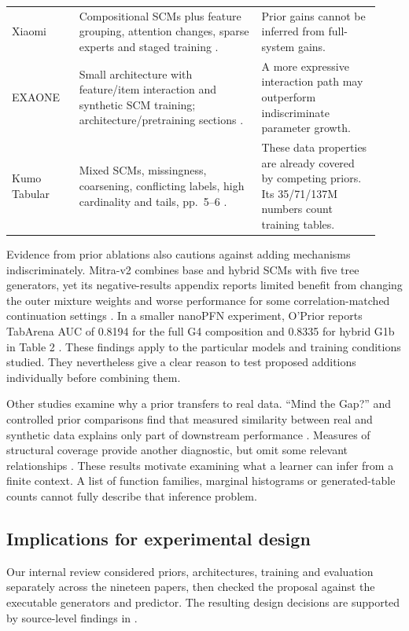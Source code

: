 \documentclass[11pt]{article}
\begin{document}
\begin{longtable}{@{}p{0.17\linewidth}p{0.46\linewidth}p{0.30\linewidth}@{}}
Xiaomi & Compositional SCMs plus feature grouping, attention changes, sparse experts and staged training \cite{xiaomi}. & Prior gains cannot be inferred from full-system gains.\\
EXAONE & Small architecture with feature/item interaction and synthetic SCM training; architecture/pretraining sections \cite{exaone}. & A more expressive interaction path may outperform indiscriminate parameter growth.\\
Kumo Tabular & Mixed SCMs, missingness, coarsening, conflicting labels, high cardinality and tails, pp.\ 5--6 \cite{kumo}. & These data properties are already covered by competing priors. Its 35/71/137M numbers count training tables.\\
\bottomrule
\end{longtable}

Evidence from prior ablations also cautions against adding mechanisms indiscriminately. Mitra-v2 combines base and hybrid SCMs with five tree generators, yet its negative-results appendix reports limited benefit from changing the outer mixture weights and worse performance for some correlation-matched continuation settings \cite{mitra2}. In a smaller nanoPFN experiment, O'Prior reports TabArena AUC of 0.8194 for the full G4 composition and 0.8335 for hybrid G1b in Table 2 \cite{oprior}. These findings apply to the particular models and training conditions studied. They nevertheless give a clear reason to test proposed additions individually before combining them.

Other studies examine why a prior transfers to real data. ``Mind the Gap?'' and controlled prior comparisons find that measured similarity between real and synthetic data explains only part of downstream performance \cite{mindgap,prioreval}. Measures of structural coverage provide another diagnostic, but omit some relevant relationships \cite{structuralcoverage}. These results motivate examining what a learner can infer from a finite context. A list of function families, marginal histograms or generated-table counts cannot fully describe that inference problem.

\subsection{Implications for experimental design}

Our internal review considered priors, architectures, training and evaluation separately across the nineteen papers, then checked the proposal against the executable generators and predictor. The resulting design decisions are supported by source-level findings in .
\end{document}
